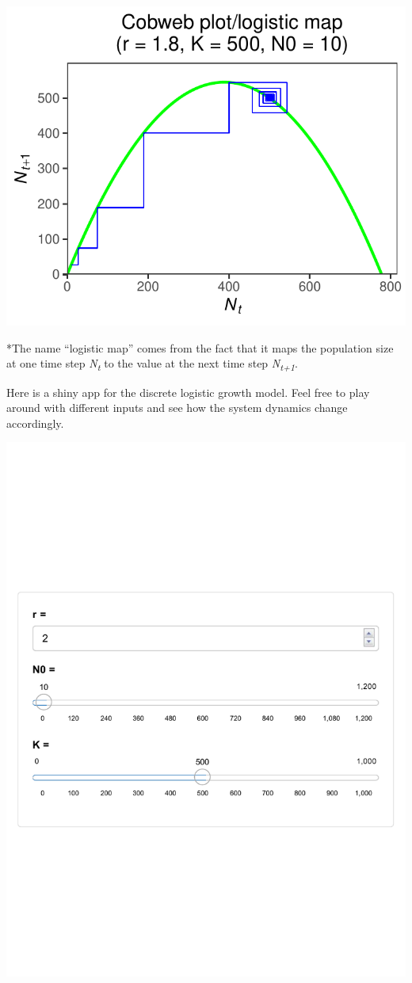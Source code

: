 \documentclass[
]{book}
\begin{document}
\begin{center}\includegraphics[width=0.7\linewidth]{04_Week_4_files/figure-latex/unnamed-chunk-2-2} \end{center}

*The name ``logistic map'' comes from the fact that it maps the population size at one time step \emph{N\textsubscript{t}} to the value at the next time step \emph{N\textsubscript{t+1}}.

Here is a shiny app for the discrete logistic growth model. Feel free to play around with different inputs and see how the system dynamics change accordingly.

\href{https://genchanghsu0115.shinyapps.io/Discrete_logistic_mod_shinyapp/}{\includegraphics[width=800px]{04_Week_4_files/figure-latex/unnamed-chunk-3-1} }
\end{document}
